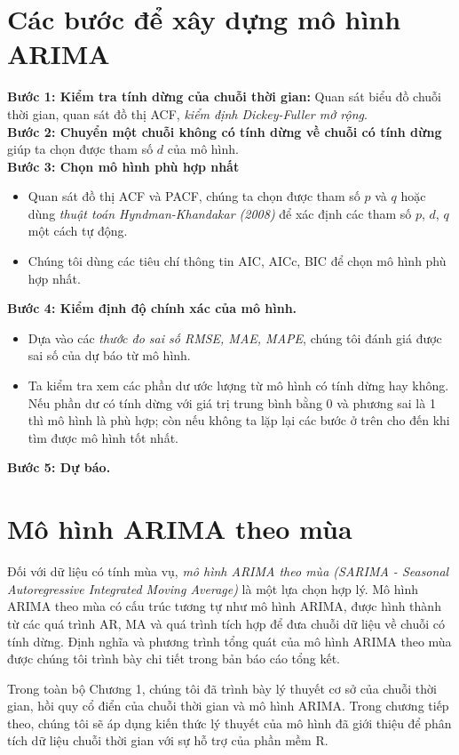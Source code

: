 \documentclass[12pt, a4paper,oneside]{book}
\theoremstyle{definition}
\begin{document}
\section{Các bước để xây dựng mô hình ARIMA} 
\textbf{Bước 1: Kiểm tra tính dừng của chuỗi thời gian:} Quan sát biểu đồ chuỗi thời gian, quan sát đồ thị ACF, \textit{kiểm định Dickey-Fuller mở rộng}.\\
\textbf{Bước 2: Chuyển một chuỗi không có tính dừng về chuỗi có tính dừng}  giúp ta chọn được tham số $d$ của mô hình.\\
\textbf{Bước 3: Chọn mô hình phù hợp nhất}
\begin{itemize}
	\item Quan sát đồ thị ACF và PACF, chúng ta chọn được tham số $p$ và $q$ hoặc dùng \textit{thuật toán Hyndman-Khandakar (2008)} để xác định các tham số $p$, $d$, $q$ một cách tự động.
	\item Chúng tôi dùng các tiêu chí thông tin AIC, AICc, BIC để chọn mô hình phù hợp nhất.
\end{itemize}
\textbf{Bước 4: Kiểm định độ chính xác của mô hình.}
\begin{itemize}
	\item Dựa vào các \textit{thước đo sai số RMSE, MAE, MAPE}, chúng tôi đánh giá được sai số của dự báo từ mô hình.
	\item Ta kiểm tra xem các phần dư ước lượng từ mô hình có tính dừng hay không. Nếu phần dư có tính dừng với giá trị trung bình bằng 0 và phương sai là 1 thì mô hình là phù hợp; còn nếu không ta lặp lại các bước ở trên cho đến khi tìm được mô hình tốt nhất.
\end{itemize}
\textbf{Bước 5: Dự báo.}

\section{Mô hình ARIMA theo mùa}
Đối với dữ liệu có tính mùa vụ, \textit{mô hình ARIMA theo mùa (SARIMA - Seasonal Autoregressive Integrated Moving Average)} là một lựa chọn hợp lý. Mô hình ARIMA theo mùa có cấu trúc tương tự như mô hình ARIMA, được hình thành từ các quá trình AR, MA và quá trình tích hợp để đưa chuỗi dữ liệu về chuỗi có tính dừng. Định nghĩa và phương trình tổng quát của mô hình ARIMA theo mùa được chúng tôi trình bày chi tiết trong bản báo cáo tổng kết.

Trong toàn bộ Chương 1, chúng tôi đã trình bày lý thuyết cơ sở của chuỗi thời gian, hồi quy cổ điển của chuỗi thời gian và mô hình ARIMA. Trong chương tiếp theo, chúng tôi sẽ áp dụng kiến thức lý thuyết của mô hình đã giới thiệu để phân tích dữ liệu chuỗi thời gian với sự hỗ trợ của phần mềm R.
	
\end{document}
